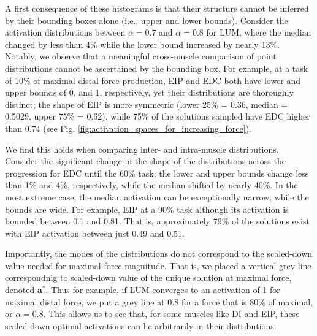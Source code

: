 \documentclass[10pt,letterpaper]{article}
\begin{document}
A first consequence of these histograms is that their structure cannot be inferred by their bounding boxes alone (i.e., upper and lower bounds).
Consider the activation distributions between $\alpha = 0.7$ and $\alpha = 0.8$ for LUM, where the median changed by less than 4\% while the lower bound increased by nearly 13\%.
Notably, we observe that a meaningful cross-muscle comparison of point distributions cannot be ascertained by the bounding box. For example, at a task of 10\% of maximal distal force production, EIP and EDC both have lower and upper bounds of 0, and 1, respectively, yet their distributions are thoroughly distinct; the shape of EIP is more symmetric (lower 25\% = 0.36, median = 0.5029, upper 75\% = 0.62), while 75\% of the solutions sampled have EDC higher than 0.74 (see Fig. \ref{fig:activation_spaces_for_increasing_force}). 

We find this holds when comparing inter- and intra-muscle distributions. Consider the significant change in the shape of the distributions across the progression for EDC until the 60\% task; the lower and upper bounds change less than 1\% and 4\%, respectively, while the median shifted by nearly 40\%.
In the most extreme case, the median activation can be exceptionally narrow, while the bounds are wide. For example, EIP at a 90\% task although its activation is bounded between 0.1 and 0.81. That is, approximately 79\% of the solutions exist with EIP activation between just 0.49 and 0.51.


Importantly, the modes of the distributions do not correspond to the scaled-down value needed for maximal force magnitude.  That is, we  placed a vertical grey line correspondnig to scaled-down value of the unique solution at maximal force, denoted $\textbf{a}^*$. Thus for example, if LUM converges to an activation of 1 for maximal distal force, we put a grey line at 0.8 for a force that is 80\% of maximal, or  $\alpha=0.8$.
This allows us to see that, for some muscles like DI and EIP, these scaled-down optimal activations can lie arbitrarily in their distributions.
\end{document}
